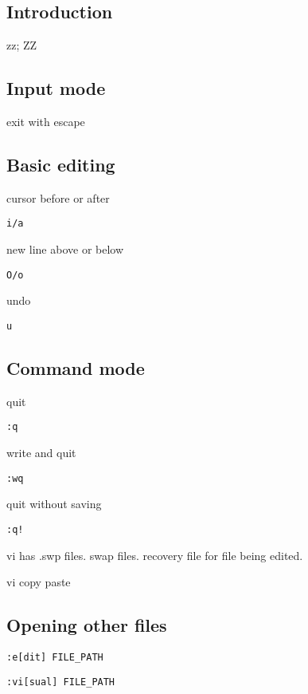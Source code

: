 
\subsection{Introduction}



zz; ZZ



\subsection{Input mode}
exit with escape

\subsection{Basic editing}
cursor before or after

\begin{verbatim}
i/a
\end{verbatim}

new line above or below

\begin{verbatim}
O/o
\end{verbatim}


undo
\begin{verbatim}
u
\end{verbatim}


\subsection{Command mode}


quit
\begin{verbatim}
:q
\end{verbatim}

write and quit
\begin{verbatim}
:wq
\end{verbatim}

quit without saving
\begin{verbatim}
:q!
\end{verbatim}


vi has .swp files. swap files. recovery file for file being edited.

vi copy paste


\subsection{Opening other files}

\begin{verbatim}
:e[dit] FILE_PATH
\end{verbatim}

\begin{verbatim}
:vi[sual] FILE_PATH
\end{verbatim}


